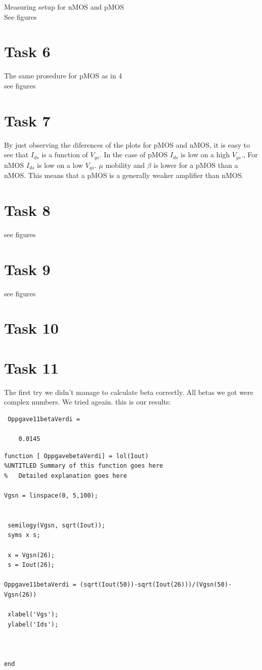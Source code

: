\documentclass[11pt,a4paper,final]{report}
\begin{document}
Measuring setup for nMOS and pMOS\\
See figures

\section{Task 6}

The same prosedure for pMOS as in 4\\
see figures

\section{Task 7}
By just observing the diferences of the plots for pMOS and nMOS, it is easy to see that $I_{ds}$ is a function of $V_{gs}$. In the case of pMOS $I_{ds}$ is low on a high  $V_{gs}$., For nMOS $I_{ds}$ is low on a low $V_{gs}$.
$\mu$ mobility and $\beta$ is lower for a pMOS than a nMOS. This means that a pMOS is a generally weaker amplifier than nMOS.

\section{Task 8}
 
see figures

\section{Task 9}

see figures


\section{Task 10}

\section{Task 11}
The first try we didn't manage to calculate beta correctly. All betas we got were complex numbers.
We tried ageain. this is our results:

\begin{verbatim}
 Oppgave11betaVerdi =

    0.0145
\end{verbatim}
\begin{verbatim}
function [ OppgavebetaVerdi] = lol(Iout)
%UNTITLED Summary of this function goes here
%   Detailed explanation goes here

Vgsn = linspace(0, 5,100);

   
 semilogy(Vgsn, sqrt(Iout));
 syms x s;
 
 x = Vgsn(26);
 s = Iout(26);
 
Oppgave11betaVerdi = (sqrt(Iout(50))-sqrt(Iout(26)))/(Vgsn(50)-Vgsn(26))
 
 xlabel('Vgs');
 ylabel('Ids');



end

\end{verbatim}
\end{document}
